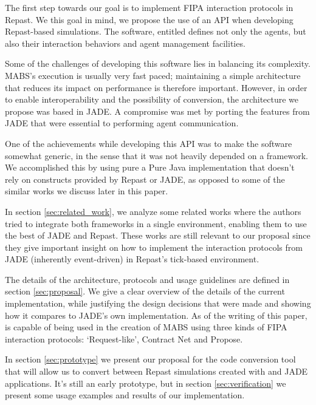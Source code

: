 The first step towards our goal is to implement FIPA interaction protocols in Repast. We this goal in mind, we propose the use of an API when developing Repast-based simulations. The software, entitled \apiname{} defines not only the agents, but also their interaction behaviors and agent management facilities.

Some of the challenges of developing this software lies in balancing its complexity. MABS's execution is usually very fast paced; maintaining a simple architecture that reduces its impact on performance is therefore important. However, in order to enable interoperability and the possibility of conversion, the architecture we propose was based in JADE. A compromise was met by porting the features from JADE that were essential to performing agent communication.

One of the achievements while developing this API was to make the software somewhat generic, in the sense that it was not heavily depended on a framework. We accomplished this by using pure a Pure Java implementation that doesn't rely on constructs provided by Repast or JADE, as opposed to some of the similar works we discuss later in this paper.

In section \ref{sec:related_work}, we analyze some related works where the authors tried to integrate both frameworks in a single environment, enabling them to use the best of JADE and Repast. These works are still relevant to our proposal since they give important insight on how to implement the interaction protocols from JADE (inherently event-driven) in Repast's tick-based environment.

The details of the architecture, protocols and usage guidelines are defined in section \ref{sec:proposal}. We give a clear overview of the details of the current implementation, while justifying the design decisions that were made and showing how it compares to JADE's own implementation. As of the writing of this paper, \apiname{} is capable of being used in the creation of MABS using three kinds of FIPA interaction protocols: `Request-like', Contract Net and Propose.

In section \ref{sec:prototype} we present our proposal for the code conversion tool that will allow us to convert between Repast simulations created with \apiname{} and JADE applications. It's still an early prototype, but in section \ref{sec:verification} we present some usage examples and results of our implementation.
